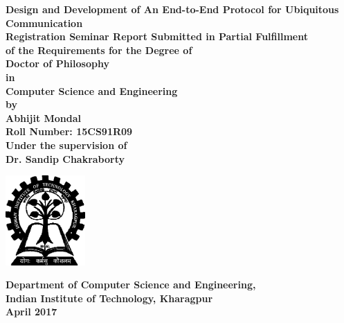 \thispagestyle{empty}
\begin{titlepage}
\begin{center}
    \vspace*{0.5in}
    {\huge\textbf{Design and Development of An End-to-End Protocol for Ubiquitous Communication}} \\
    \vspace{0.6in}
     {\large\bf Registration Seminar Report Submitted in Partial Fulfillment\\ of the Requirements for the Degree of }\\
     \vspace{0.3in}
     {\large\bf Doctor of Philosophy}\\
     {\large\bf in}\\
     {\large\bf Computer Science and Engineering}\\     
    \vspace{0.5in}
    {\large\bf by}\\
    \vspace{0.3in}
    {\Large\bf Abhijit Mondal}\\
    \vspace{0.1in}
    {\Large\bf Roll Number: 15CS91R09}\\
    \vspace{0.5in}
    {\large\bf Under the supervision of}\\
    \vspace{0.2in}
    {\Large\bf  Dr. Sandip Chakraborty}\\
    \vspace{0.5in}
    \begin{center}
        \includegraphics[width=1.2in]{img/iit_logo}
    \end{center}
    {\Large\textbf{Department of Computer Science and Engineering,}}\medskip\\
    {\Large\textbf{Indian Institute of Technology, Kharagpur}}\medskip\\
    {\large\textbf{April 2017}}
\end{center}
\end{titlepage}
